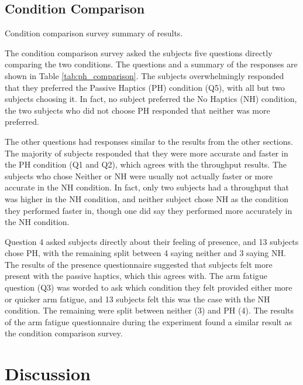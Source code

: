 \subsection{Condition Comparison}

\begin{table}
    \centering
    \caption{Condition comparison survey summary of results.}
    \label{tab:ph_comparison}
\end{table}

The condition comparison survey asked the subjects five questions directly comparing the two conditions.
The questions and a summary of the responses are shown in Table \ref{tab:ph_comparison}.
The subjects overwhelmingly responded that they preferred the Passive Haptics (PH) condition (Q5), with all but two subjects choosing it.
In fact, no subject preferred the No Haptics (NH) condition, the two subjects who did not choose PH responded that neither was more preferred.

The other questions had responses similar to the results from the other sections.
The majority of subjects responded that they were more accurate and faster in the PH condition (Q1 and Q2), which agrees with the throughput results.
The subjects who chose Neither or NH were usually not actually faster or more accurate in the NH condition.
In fact, only two subjects had a throughput that was higher in the NH condition, and neither subject chose NH as the condition they performed faster in, though one did say they performed more accurately in the NH condition.

Question 4 asked subjects directly about their feeling of presence, and 13 subjects chose PH, with the remaining split between 4 saying neither and 3 saying NH.
The results of the presence questionnaire suggested that subjects felt more present with the passive haptics, which this agrees with.
The arm fatigue question (Q3) was worded to ask which condition they felt provided either more or quicker arm fatigue, and 13 subjects felt this was the case with the NH condition.
The remaining were split between neither (3) and PH (4).
The results of the arm fatigue questionnaire during the experiment found a similar result as the condition comparison survey.

\section{Discussion}

